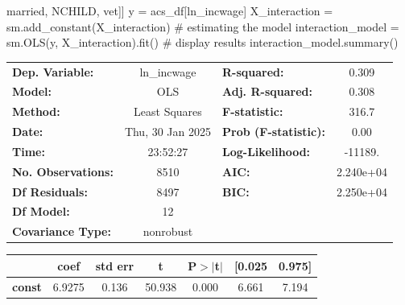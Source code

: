 \documentclass[
  letterpaper,
  DIV=11,
  numbers=noendperiod]{scrartcl}
\newenvironment{Shaded}{\begin{snugshade}}{\end{snugshade}}
\newcommand{\CommentTok}[1]{\textcolor[rgb]{0.37,0.37,0.37}{#1}}
\newcommand{\NormalTok}[1]{\textcolor[rgb]{0.00,0.23,0.31}{#1}}
\newcommand{\OperatorTok}[1]{\textcolor[rgb]{0.37,0.37,0.37}{#1}}
\newcommand{\StringTok}[1]{\textcolor[rgb]{0.13,0.47,0.30}{#1}}
\begin{document}
\begin{Shaded}
\begin{Highlighting}[]
                        \StringTok{\textquotesingle{}married\textquotesingle{}}\NormalTok{, }\StringTok{\textquotesingle{}NCHILD\textquotesingle{}}\NormalTok{, }\StringTok{\textquotesingle{}vet\textquotesingle{}}\NormalTok{]]}
\NormalTok{y }\OperatorTok{=}\NormalTok{ acs\_df[}\StringTok{\textquotesingle{}ln\_incwage\textquotesingle{}}\NormalTok{]}
\NormalTok{X\_interaction }\OperatorTok{=}\NormalTok{ sm.add\_constant(X\_interaction)}
\CommentTok{\# estimating the model}
\NormalTok{interaction\_model }\OperatorTok{=}\NormalTok{ sm.OLS(y, X\_interaction).fit()}
\CommentTok{\# display results}
\NormalTok{interaction\_model.summary()}
\end{Highlighting}
\end{Shaded}

\begin{center}
\begin{tabular}{lclc}
\toprule
\textbf{Dep. Variable:}    &   ln\_incwage    & \textbf{  R-squared:         } &     0.309   \\
\textbf{Model:}            &       OLS        & \textbf{  Adj. R-squared:    } &     0.308   \\
\textbf{Method:}           &  Least Squares   & \textbf{  F-statistic:       } &     316.7   \\
\textbf{Date:}             & Thu, 30 Jan 2025 & \textbf{  Prob (F-statistic):} &     0.00    \\
\textbf{Time:}             &     23:52:27     & \textbf{  Log-Likelihood:    } &   -11189.   \\
\textbf{No. Observations:} &        8510      & \textbf{  AIC:               } & 2.240e+04   \\
\textbf{Df Residuals:}     &        8497      & \textbf{  BIC:               } & 2.250e+04   \\
\textbf{Df Model:}         &          12      & \textbf{                     } &             \\
\textbf{Covariance Type:}  &    nonrobust     & \textbf{                     } &             \\
\bottomrule
\end{tabular}
\begin{tabular}{lcccccc}
                        & \textbf{coef} & \textbf{std err} & \textbf{t} & \textbf{P$> |$t$|$} & \textbf{[0.025} & \textbf{0.975]}  \\
\midrule
\textbf{const}          &       6.9275  &        0.136     &    50.938  &         0.000        &        6.661    &        7.194     \\

\end{tabular}
\end{center}
\end{document}

